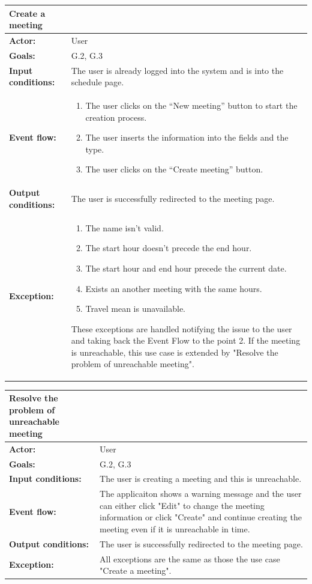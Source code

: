 \begin{tabular} { p{5cm} p{8cm} }  
\textbf{Create a meeting}\\
\hline
\textbf{Actor:} & User \\ 
\textbf{Goals:} & G.2, G.3 \\ 
\textbf{Input conditions:} & The user is already logged into the system and is into the schedule page. \\
\textbf{Event flow:} & \begin{enumerate}
				\item
				The user clicks on the “New meeting” button to start the creation process.
				\item
				The user inserts the information  into the fields and the type.
				\item
				The user clicks on the “Create meeting” button.
			\end{enumerate}\\ 
\textbf{Output conditions:} & The user is successfully redirected to the
meeting page.\\ 
\textbf{Exception:} & \begin{enumerate}
				\item
				The name isn’t valid.
				\item
				The start hour doesn’t precede the end hour.
				\item
				The start hour and end hour precede the current date.
				\item
				Exists an another meeting with the same hours. 
				\item
				Travel mean is unavailable. 
			\end{enumerate}
These exceptions are handled notifying the issue to the user and taking back the Event Flow to the point 2.
If the meeting is unreachable, this use case is extended by "Resolve the problem of unreachable meeting".
\\
\hline
\end{tabular}

\begin{tabular} { p{5cm} p{8cm} }  
\textbf{Resolve the problem of unreachable meeting}\\
\hline
\textbf{Actor:} & User \\ 
\textbf{Goals:} & G.2, G.3 \\ 
\textbf{Input conditions:} & The user is creating a meeting and this is unreachable.\\
\textbf{Event flow:} & The applicaiton shows a warning message and the user can either click "Edit" to change the meeting information or click "Create" and continue creating the meeting even if it is unreachable in time.\\ 
\textbf{Output conditions:} & The user is successfully redirected to the
meeting page.\\ 
\textbf{Exception:} & All exceptions are the same as those the use case "Create a meeting". \\
\hline
\end{tabular}


